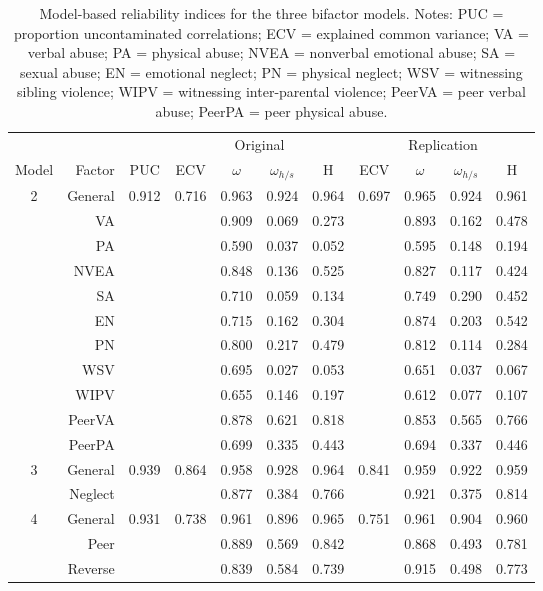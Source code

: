 \documentclass[letterpaper,man,natbib,noextraspace,floatsintext,longtable,12pt]{apa6}
\begin{document}
\begin{table}[t!]
\centering
\begin{tabular*}{\textwidth}{crccccccccc}
\toprule
& & & \multicolumn{4}{c}{Original} & \multicolumn{4}{c}{Replication} \\
\cmidrule(lr){4-7}\cmidrule(lr){8-11}
Model & Factor & PUC & ECV & $\omega$ & $\omega_{h/s}$ & H & ECV & $\omega$ & $\omega_{h/s}$ & H \\
\midrule
2 & General &  0.912 & 0.716 &  0.963 &   0.924 &  0.964 & 0.697 & 0.965 & 0.924 & 0.961 \\
& VA        &        &       &  0.909 &   0.069 &  0.273 &       & 0.893 & 0.162 & 0.478 \\
& PA        &        &       &  0.590 &   0.037 &  0.052 &       & 0.595 & 0.148 & 0.194 \\
& NVEA      &        &       &  0.848 &   0.136 &  0.525 &       & 0.827 & 0.117 & 0.424 \\
& SA        &        &       &  0.710 &   0.059 &  0.134 &       & 0.749 & 0.290 & 0.452 \\
& EN        &        &       &  0.715 &   0.162 &  0.304 &       & 0.874 & 0.203 & 0.542 \\
& PN        &        &       &  0.800 &   0.217 &  0.479 &       & 0.812 & 0.114 & 0.284 \\
& WSV       &        &       &  0.695 &   0.027 &  0.053 &       & 0.651 & 0.037 & 0.067 \\
& WIPV      &        &       &  0.655 &   0.146 &  0.197 &       & 0.612 & 0.077 & 0.107 \\
& PeerVA    &        &       &  0.878 &   0.621 &  0.818 &       & 0.853 & 0.565 & 0.766 \\
& PeerPA    &        &       &  0.699 &   0.335 &  0.443 &       & 0.694 & 0.337 & 0.446 \\
\midrule
3 & General &  0.939 & 0.864 &  0.958 &   0.928 &  0.964 & 0.841 & 0.959 & 0.922 & 0.959 \\
& Neglect   &        &       &  0.877 &   0.384 &  0.766 &       & 0.921 & 0.375 & 0.814 \\
\midrule
4 & General &  0.931 & 0.738 &  0.961 &   0.896 &  0.965 & 0.751 & 0.961 & 0.904 & 0.960 \\
& Peer      &        &       &  0.889 &   0.569 &  0.842 &       & 0.868 & 0.493 & 0.781 \\
& Reverse   &        &       &  0.839 &   0.584 &  0.739 &       & 0.915 & 0.498 & 0.773 \\
\bottomrule
\end{tabular*}
\captionsetup{width=1.\textwidth}
\caption{\normalfont Model-based reliability indices for the three bifactor models. Notes: PUC = proportion uncontaminated correlations; ECV = explained common variance; VA = verbal abuse; PA = physical abuse; NVEA = nonverbal emotional abuse; SA = sexual abuse; EN = emotional neglect; PN = physical neglect; WSV = witnessing sibling violence; WIPV = witnessing inter-parental violence; PeerVA = peer verbal abuse; PeerPA = peer physical abuse.}
\label{table:reliability}
\end{table}
\end{document}
